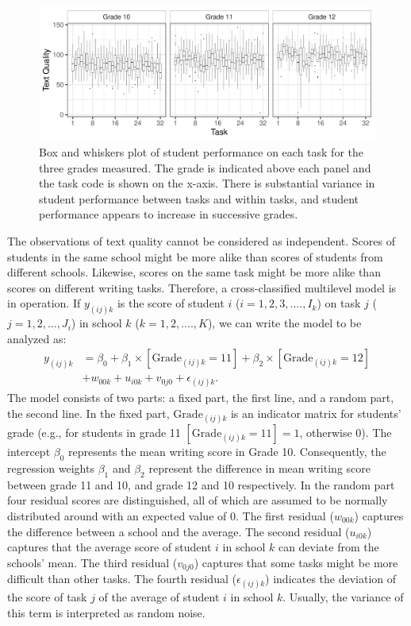 \documentclass[a4paper]{article}
\begin{document}
\begin{figure}[!ht]
	\includegraphics[width=\textwidth]{descriptivesBaseline.pdf}
	\caption{Box and whiskers plot of student performance on each task for the three grades measured. The grade is indicated above each panel and the task code is shown on the x-axis. There is substantial variance in student performance between tasks and within tasks, and student performance appears to increase in successive grades.}
	\label{fig:baselineDescriptives}
\end{figure}
The observations of text quality cannot be considered as independent.
Scores of students in the same school might be more alike than scores of students from different schools.
Likewise, scores on the same task might be more alike than scores on different writing tasks.
Therefore, a cross-classified multilevel model is in operation.
If $y_{(ij)k}$ is the score of student $i$ ($i = 1, 2, 3, ...., I_k$) on task $j$ ($j = 1, 2, ..., J_i$) in school $k$ ($k = 1, 2, ...., K$), we can write the model to be analyzed as:
\begin{align*}
	y_{(ij)k} &= \beta_0 + \beta_1 \times [\mathrm{Grade}_{(ij)k}=11] + \beta_2 \times [\mathrm{Grade}_{(ij)k}=12]\\
			  &+ w_{00k} + u_{i0k} + v_{0j0} + \epsilon_{(ij)k}.
\end{align*}
The model consists of two parts: a fixed part, the first line, and a random part, the second line. In the fixed part, $\mathrm{Grade}_{(ij)k}$ is an indicator matrix for students' grade (e.g., for students in grade 11 $[\mathrm{Grade}_{(ij)k}=11] = 1$, otherwise 0). The intercept $\beta_0$ represents the mean writing score in Grade 10. Consequently, the regression weights $\beta_1$ and $\beta_2$ represent the difference in mean writing score between grade 11 and 10, and grade 12 and 10 respectively. In the random part four residual scores are distinguished, all of which are assumed to be normally distributed around with an expected value of 0. The first residual ($w_{00k}$) captures the difference between a school and the average. The second residual ($u_{i0k}$) captures that the average score of student $i$ in school $k$ can deviate from the schools' mean. The third residual ($v_{0j0}$) captures that some tasks might be more difficult than other tasks. The fourth residual ($\epsilon_{(ij)k}$) indicates the deviation of the score of task $j$ of the average of student $i$ in school $k$. Usually, the variance of this term is interpreted as random noise.
\end{document}
